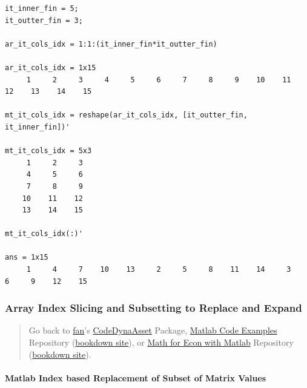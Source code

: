 \documentclass[
]{book}
\begin{document}
\begin{verbatim}
it_inner_fin = 5;
it_outter_fin = 3;

ar_it_cols_idx = 1:1:(it_inner_fin*it_outter_fin)

ar_it_cols_idx = 1x15    
     1     2     3     4     5     6     7     8     9    10    11    12    13    14    15

mt_it_cols_idx = reshape(ar_it_cols_idx, [it_outter_fin, it_inner_fin])'

mt_it_cols_idx = 5x3    
     1     2     3
     4     5     6
     7     8     9
    10    11    12
    13    14    15

mt_it_cols_idx(:)'

ans = 1x15    
     1     4     7    10    13     2     5     8    11    14     3     6     9    12    15
\end{verbatim}

\hypertarget{array-index-slicing-and-subsetting-to-replace-and-expand}{%
\subsubsection{Array Index Slicing and Subsetting to Replace and Expand}\label{array-index-slicing-and-subsetting-to-replace-and-expand}}

\begin{quote}
Go back to \href{http://fanwangecon.github.io/}{fan}'s \href{https://fanwangecon.github.io/CodeDynaAsset/}{CodeDynaAsset} Package, \href{https://fanwangecon.github.io/M4Econ/}{Matlab Code Examples} Repository (\href{https://fanwangecon.github.io/M4Econ/bookdown}{bookdown site}), or \href{https://fanwangecon.github.io/Math4Econ/}{Math for Econ with Matlab} Repository (\href{https://fanwangecon.github.io/Math4Econ/bookdown}{bookdown site}).
\end{quote}

\hypertarget{matlab-index-based-replacement-of-subset-of-matrix-values}{%
\paragraph{Matlab Index based Replacement of Subset of Matrix Values}\label{matlab-index-based-replacement-of-subset-of-matrix-values}}
\end{document}
